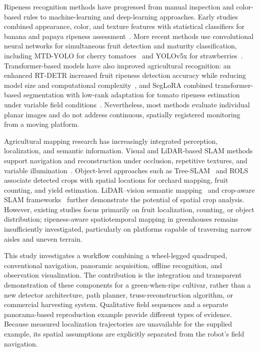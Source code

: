 \documentclass[agriengineering,article,submit,pdftex,moreauthors]{Definitions/mdpi}
\begin{document}
Ripeness recognition methods have progressed from manual inspection and color-based rules to machine-learning and deep-learning approaches. Early studies combined appearance, color, and texture features with statistical classifiers for banana and papaya ripeness assessment~\cite{mendoza2004application,pereira2018predicting}. More recent methods use convolutional neural networks for simultaneous fruit detection and maturity classification, including MTD-YOLO for cherry tomatoes~\cite{chen2024mtd} and YOLOv5x for strawberries~\cite{vicente2025intelligent}. Transformer-based models have also improved agricultural recognition: an enhanced RT-DETR increased fruit ripeness detection accuracy while reducing model size and computational complexity~\cite{wu2025improved}, and SegLoRA combined transformer-based segmentation with low-rank adaptation for tomato ripeness estimation under variable field conditions~\cite{pisharody2025precise}. Nevertheless, most methods evaluate individual planar images and do not address continuous, spatially registered monitoring from a moving platform.

Agricultural mapping research has increasingly integrated perception, localization, and semantic information. Visual and LiDAR-based SLAM methods support navigation and reconstruction under occlusion, repetitive textures, and variable illumination~\cite{islam2023agri,cuaran2024under,han2023visual}. Object-level approaches such as Tree-SLAM~\cite{rapado2025tree} and ROLS~\cite{nellithimaru2019rols} associate detected crops with spatial locations for orchard mapping, fruit counting, and yield estimation. LiDAR--vision semantic mapping~\cite{pan2024novel} and crop-aware SLAM frameworks~\cite{yuan2024simultaneous} further demonstrate the potential of spatial crop analysis. However, existing studies focus primarily on fruit localization, counting, or object distribution; ripeness-aware spatiotemporal mapping in greenhouses remains insufficiently investigated, particularly on platforms capable of traversing narrow aisles and uneven terrain.


This study investigates a workflow combining a wheel-legged quadruped, conventional navigation, panoramic acquisition, offline recognition, and observation visualization. The contribution is the integration and transparent demonstration of these components for a green-when-ripe cultivar, rather than a new detector architecture, path planner, truss-reconstruction algorithm, or commercial harvesting system. Qualitative field sequences and a separate panorama-based reproduction example provide different types of evidence. Because measured localization trajectories are unavailable for the supplied example, its spatial assumptions are explicitly separated from the robot's field navigation.
\end{document}
